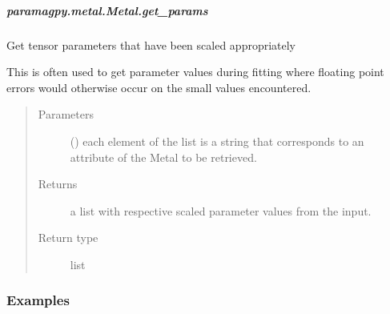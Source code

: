 \documentclass[a4paper,10pt,english,openany,oneside]{sphinxmanual}
\begin{document}
\begin{fulllineitems}
\begin{fulllineitems}
\begin{fulllineitems}
\end{fulllineitems}



\subparagraph{paramagpy.metal.Metal.get\_params}
\label{\detokenize{reference/generated/paramagpy.metal.Metal.get_params:paramagpy-metal-metal-get-params}}\label{\detokenize{reference/generated/paramagpy.metal.Metal.get_params::doc}}

\begin{fulllineitems}
\label{\detokenize{reference/generated/paramagpy.metal.Metal.get_params:paramagpy.metal.Metal.get_params}}
Get tensor parameters that have been scaled appropriately

This is often used to get parameter values during fitting where
floating point errors would otherwise occur on the small values
encountered.
\begin{quote}\begin{description}
\item[{Parameters}] \leavevmode
{} () \textendash{} each element of the list is a string that corresponds to
an attribute of the Metal to be retrieved.

\item[{Returns}] \leavevmode
{} \textendash{} a list with respective scaled parameter values from the input.

\item[{Return type}] \leavevmode
list

\end{description}\end{quote}
\subsubsection*{Examples}


\end{fulllineitems}
\end{fulllineitems}
\end{fulllineitems}
\end{document}
